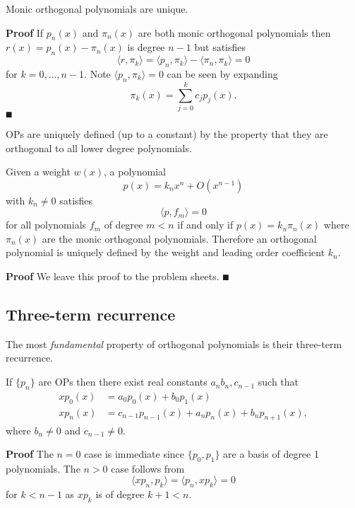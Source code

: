 \begin{corollary}[uniqueness] Monic orthogonal polynomials are unique.

\end{corollary}
\textbf{Proof} If $p_n(x)$ and $\ensuremath{\pi}_n(x)$ are both monic orthogonal polynomials then $r(x) = p_n(x) - \ensuremath{\pi}_n(x)$ is degree $n-1$ but satisfies
\[
\ensuremath{\langle}r, \ensuremath{\pi}_k\ensuremath{\rangle} = \ensuremath{\langle}p_n, \ensuremath{\pi}_k\ensuremath{\rangle} - \ensuremath{\langle}\ensuremath{\pi}_n, \ensuremath{\pi}_k\ensuremath{\rangle} = 0
\]
for $k = 0,\ensuremath{\ldots},{n-1}$. Note $\ensuremath{\langle}p_n, \ensuremath{\pi}_k\ensuremath{\rangle} = 0$ can be seen by expanding
\[
\ensuremath{\pi}_k(x) = \ensuremath{\sum}_{j=0}^k c_j p_j(x).
\]
\ensuremath{\QED}

OPs are uniquely defined (up to a constant) by the property that they are orthogonal to all lower degree polynomials.

\begin{theorem} Given a weight $w(x)$, a polynomial
\[
p(x) = k_n x^n + O(x^{n-1})
\]
with $k_n \ensuremath{\neq} 0$ satisfies
\[
\ensuremath{\langle}p,f_m\ensuremath{\rangle} = 0
\]
for all  polynomials $f_m$ of degree $m < n$ if and only if $p(x) = k_n \ensuremath{\pi}_n(x)$ where $\ensuremath{\pi}_n(x)$ are the monic orthogonal polynomials. Therefore an orthogonal polynomial is uniquely defined by the weight and leading order coefficient $k_n$.

\end{theorem}
\textbf{Proof} We leave this proof to the problem sheets. \ensuremath{\QED}

\subsection{Three-term recurrence}
The most \emph{fundamental} property of orthogonal polynomials is their three-term recurrence.

\begin{theorem} If $\{p_n\}$ are OPs then there exist real constants $a_n b_n, c_{n-1}$ such that
\begin{align*}
x p_0(x) &= a_0 p_0(x) + b_0 p_1(x)  \\
x p_n(x) &= c_{n-1} p_{n-1}(x) + a_n p_n(x) + b_n p_{n+1}(x),
\end{align*}
where $b_n \ensuremath{\neq}0$ and $c_{n-1} \ensuremath{\neq}0$. \end{theorem}
\textbf{Proof} The $n=0$ case is immediate since $\{p_0,p_1\}$ are a basis of degree 1 polynomials. The $n >0$ case follows from
\[
\ensuremath{\langle}x p_n, p_k\ensuremath{\rangle} = \ensuremath{\langle} p_n, xp_k\ensuremath{\rangle} = 0
\]
for $k < n-1$ as $x p_k$ is of degree $k+1 < n$.


